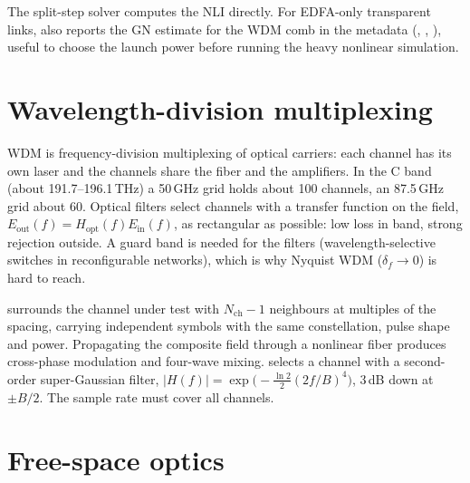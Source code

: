 \begin{incode}
The split-step solver computes the NLI directly. For EDFA-only transparent links,
 also reports the GN estimate for the WDM comb in the  metadata
(, , ), useful to choose the launch power
before running the heavy nonlinear simulation.
\end{incode}

\section{Wavelength-division multiplexing}
WDM is frequency-division multiplexing of optical carriers: each channel has its own laser and the
channels share the fiber and the amplifiers. In the C band (about 191.7--196.1\,THz) a 50\,GHz grid holds
about 100 channels, an 87.5\,GHz grid about 60. Optical filters select channels with a transfer function
on the field, $E_{\mathrm{out}}(f)=H_{\mathrm{opt}}(f)E_{\mathrm{in}}(f)$, as rectangular as possible: low loss in band, strong
rejection outside. A guard band is needed for the filters (wavelength-selective switches in
reconfigurable networks), which is why Nyquist WDM ($\delta_f\to0$) is hard to reach.

 surrounds the channel under test with $N_{\mathrm{ch}}-1$ neighbours at multiples of the
spacing, carrying independent symbols with the same constellation, pulse shape and power.
Propagating the composite field through a nonlinear fiber produces cross-phase modulation and
four-wave mixing.  selects a channel with a second-order super-Gaussian filter,
$|H(f)|=\exp\!\big(-\tfrac{\ln2}{2}(2f/B)^4\big)$, 3\,dB down at $\pm B/2$. The sample rate must cover all channels.

\section{Free-space optics}
